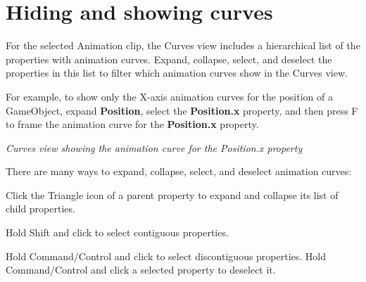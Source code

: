\chapter{Hiding and showing curves}
\hypertarget{md__hey_tea_9_2_library_2_package_cache_2com_8unity_8timeline_0d1_87_85_2_documentation_0i_2crv__hide}{}\label{md__hey_tea_9_2_library_2_package_cache_2com_8unity_8timeline_0d1_87_85_2_documentation_0i_2crv__hide}
\label{md__hey_tea_9_2_library_2_package_cache_2com_8unity_8timeline_0d1_87_85_2_documentation_0i_2crv__hide_autotoc_md4635}%
%
 For the selected Animation clip, the Curves view includes a hierarchical list of the properties with animation curves. Expand, collapse, select, and deselect the properties in this list to filter which animation curves show in the Curves view.

For example, to show only the X-\/axis animation curves for the position of a Game\+Object, expand {\bfseries{Position}}, select the {\bfseries{Position.\+x}} property, and then press F to frame the animation curve for the {\bfseries{Position.\+x}} property.



{\itshape Curves view showing the animation curve for the Position.\+x property}

There are many ways to expand, collapse, select, and deselect animation curves\+:


\begin{DoxyItemize}
\item Click the Triangle icon of a parent property to expand and collapse its list of child properties.
\item Hold Shift and click to select contiguous properties.
\item Hold Command/\+Control and click to select discontiguous properties. Hold Command/\+Control and click a selected property to deselect it. 
\end{DoxyItemize}